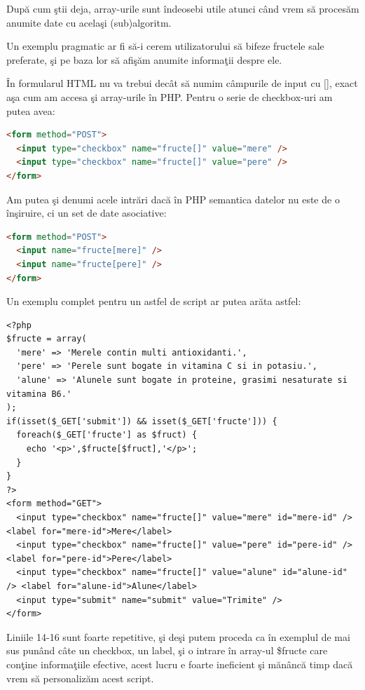 După cum ştii deja, array-urile sunt îndeosebi utile atunci când vrem să procesăm anumite date
cu acelaşi (sub)algoritm.

Un exemplu pragmatic ar fi să-i cerem utilizatorului să bifeze fructele sale preferate,
şi pe baza lor să afişăm anumite informaţii despre ele.

În formularul HTML nu va trebui decât să numim câmpurile de input cu {\glqq}[]{\grqq}, exact aşa cum
am accesa şi array-urile în PHP. Pentru o serie de checkbox-uri am putea avea:
\begin{lstlisting}[language=HTML]
<form method="POST">
  <input type="checkbox" name="fructe[]" value="mere" />
  <input type="checkbox" name="fructe[]" value="pere" />
</form>
\end{lstlisting}
Am putea şi denumi acele intrări dacă în PHP semantica datelor nu este
de o înşiruire, ci un set de date asociative:
\begin{lstlisting}[language=HTML]
<form method="POST">
  <input name="fructe[mere]" />
  <input name="fructe[pere]" />
</form>
\end{lstlisting}

Un exemplu complet pentru un astfel de script ar putea arăta astfel:
\begin{lstlisting}[label=lst:favourite-fruits,caption={Fructe favorite}]
<?php
$fructe = array(
  'mere' => 'Merele contin multi antioxidanti.',
  'pere' => 'Perele sunt bogate in vitamina C si in potasiu.',
  'alune' => 'Alunele sunt bogate in proteine, grasimi nesaturate si vitamina B6.'
);
if(isset($_GET['submit']) && isset($_GET['fructe'])) {
  foreach($_GET['fructe'] as $fruct) {
	echo '<p>',$fructe[$fruct],'</p>';
  }
}
?>
<form method="GET">
  <input type="checkbox" name="fructe[]" value="mere" id="mere-id" /> <label for="mere-id">Mere</label>
  <input type="checkbox" name="fructe[]" value="pere" id="pere-id" /> <label for="pere-id">Pere</label>
  <input type="checkbox" name="fructe[]" value="alune" id="alune-id" /> <label for="alune-id">Alune</label>
  <input type="submit" name="submit" value="Trimite" />
</form>
\end{lstlisting}

Liniile 14-16 sunt foarte repetitive, şi deşi putem proceda ca în exemplul de mai sus punând câte un
checkbox, un label, şi o intrare în array-ul \$fructe care conţine informaţiile efective, acest lucru e foarte
ineficient şi mănâncă timp dacă vrem să personalizăm acest script.


